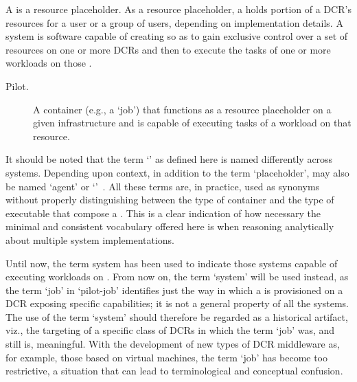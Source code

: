 \documentclass{sig-alternate}
\begin{document}
A \pilot is a resource placeholder. As a resource placeholder, a \pilot holds
portion of a DCR's resources for a user or a group of users, depending on
implementation details. A \pilotjob system is software capable of creating
\pilots so as to gain exclusive control over a set of resources on one or more
DCRs and then to execute the tasks of one or more workloads on those \pilots.
 


\begin{description}

\item[Pilot.] A container (e.g., a `job') that functions as a resource
placeholder on a given infrastructure and is capable of executing tasks of a
workload on that resource.

\end{description}

It should be noted that the term `\pilot' as defined here is named differently
across \pilotjob systems. Depending upon context, in addition to the term
`placeholder', \pilot may also be named `agent' or
`\pilotjob'~\cite{moscicki2011,pinchak2002}. All these terms are, in practice,
used as synonyms without properly distinguishing between the type of container
and the type of executable that compose a \pilot. This is a clear indication of
how necessary the minimal and consistent vocabulary offered here is when
reasoning analytically about multiple \pilotjob system implementations.

Until now, the term \pilotjob system has been used to indicate those systems
capable of executing workloads on \pilots. From now on, the term `\pilot system'
will be used instead, as the term `job' in `pilot-job' identifies just the way
in which a \pilot is provisioned on a DCR exposing specific capabilities; it is
not a general property of all the \pilotjob systems. The use of the term
`\pilotjob system' should therefore be regarded as a historical artifact, viz.,
the targeting of a specific class of DCRs in which the term `job' was, and still
is, meaningful. With the development of new types of DCR middleware as, for
example, those based on virtual machines, the term `job' has become too
restrictive, a situation that can lead to terminological and conceptual
confusion.
\end{document}
